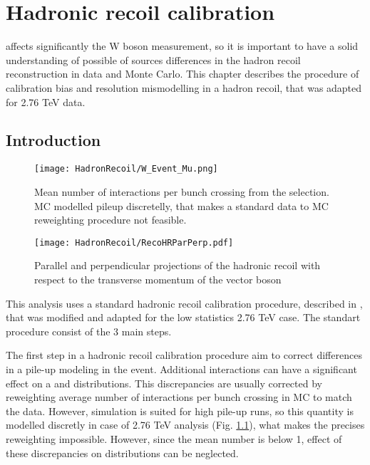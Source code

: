 \chapter{Hadronic recoil calibration}\label{sec:HadrCalib}
\minitoc

\etmiss affects significantly the W boson measurement, so it is important to have a solid understanding  of possible of sources differences in the hadron recoil reconstruction in data and Monte Carlo. This chapter describes the procedure of calibration bias and resolution mismodelling in a hadron recoil, that was adapted for 2.76 TeV data. 

\section{Introduction}
\begin{figure}[!bp]
\centering
\texttt{[image: HadronRecoil/W\_Event\_Mu.png]}
\caption{Mean number of interactions per bunch crossing from the \wenu selection. MC modelled pileup discretelly, that makes a standard data to MC reweighting procedure not feasible.}
\label{HadrRecoil:mu}
\end{figure} 

\begin{figure}[!tbp]
\begin{center}
\begin{minipage}[h]{0.49\linewidth}
\texttt{[image: HadronRecoil/RecoHRParPerp.pdf]}
\end{minipage}
\caption{Parallel and perpendicular projections of the hadronic recoil with respect to the transverse momentum of the vector boson \cite{HRPlots}}
\label{ris:HadrRecoilTruthPt}
\end{center}
\end{figure}

This analysis uses a standard hadronic recoil calibration procedure, described in \cite{HRCorrections}, that was modified and adapted for the low statistics 2.76 TeV case. The standart procedure consist of the 3 main steps. 

The first step in a hadronic recoil calibration procedure aim to correct differences in a pile-up modeling in the event. Additional interactions can have a significant effect on a \etmiss and \sumet distributions. This discrepancies are usually corrected by reweighting average number of interactions per bunch crossing in MC to match the data. However, \atlas simulation is suited for high pile-up runs, so this quantity is modelled discretly in case of 2.76 TeV analysis (Fig. \ref{HadrRecoil:mu}), what makes the precises reweighting impossible. However, since the mean number is below 1, effect of these discrepancies on \etmiss distributions can be neglected. 

